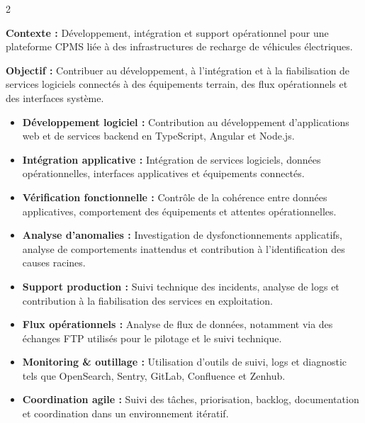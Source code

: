 \documentclass[8pt,a4paper,ragged2e,withhyper]{../_shared/altacv}
\begin{document}



\makecvheader
\vspace{-0.3cm}


\begin{paracol}{2}



\textbf{Contexte :} Développement, intégration et support opérationnel pour une plateforme CPMS liée à des infrastructures de recharge de véhicules électriques.

\textbf{Objectif :} Contribuer au développement, à l’intégration et à la fiabilisation de services logiciels connectés à des équipements terrain, des flux opérationnels et des interfaces système.

\begin{itemize}
  \item \textbf{Développement logiciel :} Contribution au développement d’applications web et de services backend en TypeScript, Angular et Node.js.
  \item \textbf{Intégration applicative :} Intégration de services logiciels, données opérationnelles, interfaces applicatives et équipements connectés.
  \item \textbf{Vérification fonctionnelle :} Contrôle de la cohérence entre données applicatives, comportement des équipements et attentes opérationnelles.
  \item \textbf{Analyse d’anomalies :} Investigation de dysfonctionnements applicatifs, analyse de comportements inattendus et contribution à l’identification des causes racines.
  \item \textbf{Support production :} Suivi technique des incidents, analyse de logs et contribution à la fiabilisation des services en exploitation.
  \item \textbf{Flux opérationnels :} Analyse de flux de données, notamment via des échanges FTP utilisés pour le pilotage et le suivi technique.
  \item \textbf{Monitoring \& outillage :} Utilisation d’outils de suivi, logs et diagnostic tels que OpenSearch, Sentry, GitLab, Confluence et Zenhub.
  \item \textbf{Coordination agile :} Suivi des tâches, priorisation, backlog, documentation et coordination dans un environnement itératif.
\end{itemize}


\end{paracol}
\end{document}
